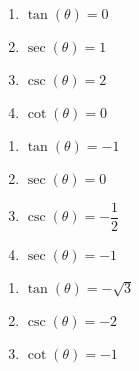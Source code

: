 \documentclass{ximera}
\begin{document}
\begin{multicols}{4}

\begin{enumerate}

\setcounter{enumi}{\value{HW}}

\item $\tan(\theta) = 0$
\item $\sec(\theta) = 1$
\item $\csc(\theta) = 2$
\item $\cot(\theta) = 0$

\setcounter{HW}{\value{enumi}}

\end{enumerate}

\end{multicols}

\begin{multicols}{4}

\begin{enumerate}

\setcounter{enumi}{\value{HW}}

\item $\tan(\theta) = -1$ 
\item $\sec(\theta) = 0$ 
\item $\csc(\theta) = -\dfrac{1}{2}$
\item  $\sec(\theta) = -1$ 

\setcounter{HW}{\value{enumi}}

\end{enumerate}

\end{multicols}

\begin{multicols}{4}

\begin{enumerate}

\setcounter{enumi}{\value{HW}}

\item  $\tan(\theta) = -\sqrt{3}$
\item  $\csc(\theta) = -2$ 
\item  $\cot(\theta) = -1$  \label{circequanglelast}

\setcounter{HW}{\value{enumi}}

\end{enumerate}

\end{multicols}
\end{document}
